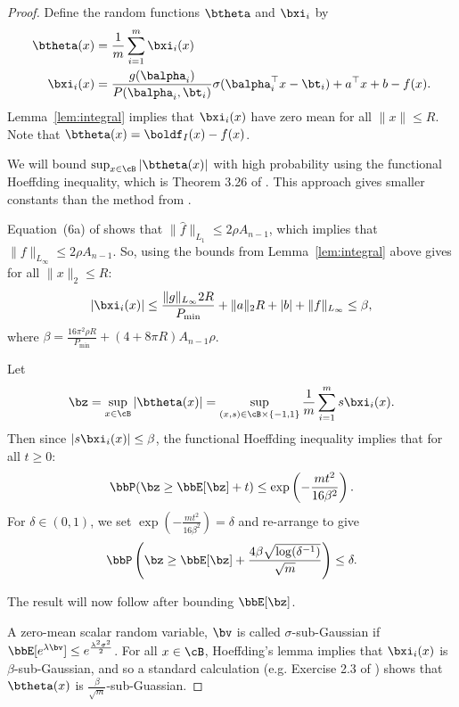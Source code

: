 \documentclass[letterpaper, 10 pt, conference]{ieeeconf}  %
\begin{document}
\begin{proof}
  Define the random functions $\btheta$ and $\bxi_i$ by
  \begin{align*}
    \btheta(x) &=\frac{1}{m}\sum_{i=1}^m\bxi_i(x) \\
    \bxi_i(x)&=\frac{g(\balpha_i)}{P(\balpha_i,\bt_i)}\sigma(\balpha_i^\top x-\bt_i)
               +a^\top x +b
               - f(x).
  \end{align*}
  Lemma~\ref{lem:integral} implies that $\bxi_i(x)$ have zero mean for all $\|x\|\le R$. Note that $\btheta(x)=\boldf_I(x)-f(x)$.

  We will bound $\sup_{x\in\cB}|\btheta(x)|$ with high probability using the functional Hoeffding inequality, which is Theorem 3.26 of \cite{wainwright2019high}. This approach gives smaller constants than the method from \cite{lamperski2024approximation}.


Equation~(6a) of \cite{lamperski2024approximation} shows that $\|\hat f\|_{L_1}\le 2\rho A_{n-1}$, which implies that $\|f\|_{L_{\infty}}\le 2 \rho A_{n-1}$. So, using the bounds from Lemma~\ref{lem:integral} above gives for all $\|x\|_2\le R$:
\begin{align*}
  |\bxi_i(x)|\le \frac{\|g\|_{L_{\infty}}2R}{P_{\min}}+\|a\|_2 R +|b|+\|f\|_{L_{\infty}}\le \beta,
\end{align*}
where $\beta = \frac{16\pi^2 \rho R}{P_{\min}}+(4+8\pi R)A_{n-1}\rho$.

  Let
  $$
  \bz=\sup_{x\in\cB}|\btheta(x)|=\sup_{(x,s)\in\cB\times \{-1,1\}}\frac{1}{m}\sum_{i=1}^ms\bxi_i(x).
  $$
  Then since $|s\bxi_i(x)|\le \beta$, the functional Hoeffding inequality implies that for all $t\ge 0$:
  \begin{equation*}
    \bbP(\bz\ge \bbE[\bz]+t)\le \exp\left(-\frac{m t^2}{16\beta^2} \right).
  \end{equation*}
  For $\delta\in (0,1)$, we set $\exp\left(-\frac{m t^2}{16\beta^2} \right) =\delta$ and re-arrange to give
  \begin{equation}
    \label{eq:funHoeffdingInvert}
    \bbP\left(\bz\ge \bbE[\bz]+\frac{4\beta\sqrt{\log(\delta^{-1})}}{\sqrt{m}}\right)\le \delta.
  \end{equation}

  The result will now follow after bounding $\bbE[\bz]$.
  
  
  

A zero-mean scalar random variable, $\bv$ is called $\sigma$-sub-Gaussian if $\bbE[e^{\lambda \bv}]\le e^{\frac{\lambda^2 \sigma^2}{2}}$. For all $x\in\cB$, Hoeffding's lemma implies that $\bxi_i(x)$ is $\beta$-sub-Gaussian, and so a standard calculation (e.g. Exercise 2.3 of \cite{wainwright2019high}) shows that $\btheta(x)$ is $\frac{\beta}{\sqrt{m}}$-sub-Guassian.


\end{proof}
\end{document}
